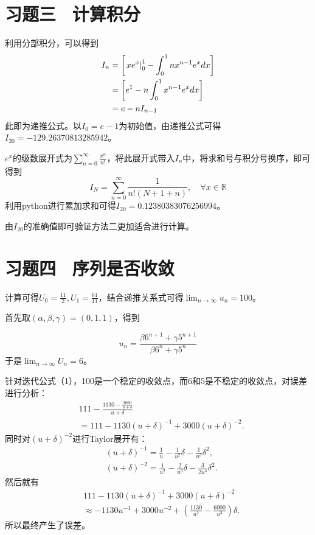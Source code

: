 \section{习题三 \ 计算积分}
利用分部积分，可以得到
\begin{align}
    I_n & = \left[\left.xe^x\right|^{1}_{0} - \int^{1}_{0}nx^{n-1}e^xdx \right] \\
        & = \left[e^1 - n\int^{1}_{0}x^{n-1}e^xdx\right] \notag                 \\
        & = e-nI_{n-1} \notag
\end{align}
此即为递推公式。以$I_0=e-1$为初始值，由递推公式可得$I_{20}=-129.26370813285942$。

$e^x$的级数展开式为$\sum_{n=0}^{\infty}\frac{x^n}{n!}$，将此展开式带入$I_n$中，将求和号与积分号换序，即可得到
\begin{equation}
    I_N=\sum_{n=0}^{\infty} \frac{1}{n !(N+1+n)}, \quad \forall x \in \mathbb{R}
\end{equation}
利用python进行累加求和可得$I_{20}=0.12380383076256994$。

由$I_{20}$的准确值即可验证方法二更加适合进行计算。
\section{习题四 \ 序列是否收敛}

计算可得$U_0=\frac{11}{2},U_1=\frac{61}{11}$，结合递推关系式可得$\lim _{n \rightarrow \infty} u_n=100$。

首先取$(\alpha, \beta, \gamma)=(0,1,1)$，得到

\begin{equation}
    u_n=\frac{\beta 6^{n+1}+\gamma 5^{n+1}}{\beta 6^n+\gamma 5^n}
\end{equation}
于是$\lim _{n \rightarrow \infty} U_n=6$。

针对迭代公式（1），100是一个稳定的收敛点，而6和5是不稳定的收敛点，对误差进行分析：
\begin{equation}
    \begin{aligned}
          & 111-\frac{1130-\frac{3000}{u+\delta}}{u+\delta} \\
          &=  111-1130(u+\delta)^{-1}+3000(u+\delta)^{-2} .
    \end{aligned}
\end{equation}
同时对$(u+\delta)^{-2}$进行Taylor展开有：
\begin{equation}
    \begin{aligned}
    &(u+\delta)^{-1}=\frac{1}{u}-\frac{1}{u^2} \delta-\frac{1}{u^3} \delta^2, \\
    &(u+\delta)^{-2}=\frac{1}{u^2}-\frac{2}{u^3} \delta-\frac{3}{2 u^4} \delta^2 .
    \end{aligned}
    \end{equation}
然后就有
\begin{equation}
    \begin{aligned}
    &111-1130(u+\delta)^{-1}+3000(u+\delta)^{-2} \\
    & \approx -1130 u^{-1}+3000 u^{-2}+\left(\frac{1130}{u^2}-\frac{6000}{u^3}\right) \delta .
    \end{aligned}
    \end{equation}
所以最终产生了误差。
